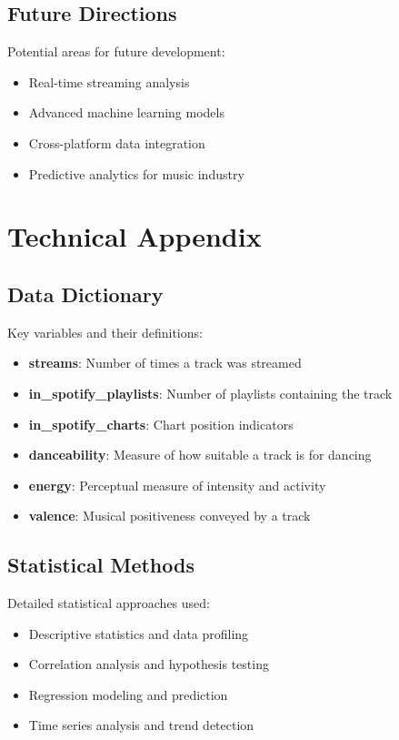 \documentclass[12pt,a4paper]{article}
\begin{document}
\subsection{Future Directions}
Potential areas for future development:
\begin{itemize}
    \item Real-time streaming analysis
    \item Advanced machine learning models
    \item Cross-platform data integration
    \item Predictive analytics for music industry
\end{itemize}

\section{Technical Appendix}

\subsection{Data Dictionary}
Key variables and their definitions:
\begin{itemize}
    \item \textbf{streams}: Number of times a track was streamed
    \item \textbf{in\_spotify\_playlists}: Number of playlists containing the track
    \item \textbf{in\_spotify\_charts}: Chart position indicators
    \item \textbf{danceability}: Measure of how suitable a track is for dancing
    \item \textbf{energy}: Perceptual measure of intensity and activity
    \item \textbf{valence}: Musical positiveness conveyed by a track
\end{itemize}

\subsection{Statistical Methods}
Detailed statistical approaches used:
\begin{itemize}
    \item Descriptive statistics and data profiling
    \item Correlation analysis and hypothesis testing
    \item Regression modeling and prediction
    \item Time series analysis and trend detection
\end{itemize}
\end{document}
